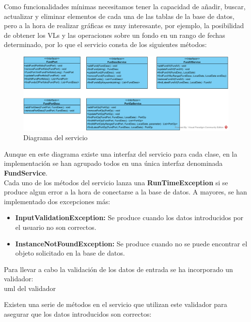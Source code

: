 \documentclass[12pt, a4paper]{book}
\begin{document}
Como funcionalidades mínimas necesitamos tener la capacidad de añadir, buscar, actualizar y eliminar elementos de cada una de las tablas de la base de datos, pero a la hora de realizar gráficas es muy interesante, por ejemplo, la posibilidad de obtener los \gls{VL}s y las operaciones sobre un fondo en un rango de fechas determinado, por lo que el servicio consta de los siguientes métodos:\\

\begin{figure}[htbp]
	\centering
	\includegraphics[width=\textwidth]{figuras/Diagrama_Modelo.png}
	\caption{Diagrama del servicio}
	\label{fig:relacional}
	\end {figure}

Aunque en este diagrama existe una interfaz del servicio para cada clase, en la implementación se han agrupado todos en una única interfaz denominada \textbf{FundService}.\\

Cada uno de los métodos del servicio lanza una \textbf{RunTimeException} si se produce algun error a la hora de conectarse a la base de datos. A mayores, se han implementado dos excepciones más:

\begin{itemize}
	\item \textbf{InputValidationException:} Se produce cuando los datos introducidos por el usuario no son correctos.
	\item \textbf{InstanceNotFoundException:} Se produce cuando no se puede encontrar el objeto solicitado en la base de datos.
\end{itemize}


Para llevar a cabo la validación de los datos de entrada se ha incorporado un validador: \\

uml del validador\\

\newpage

Existen una serie de métodos en el servicio que utilizan este validador para asegurar que los datos introducidos son correctos:
\end{document}
